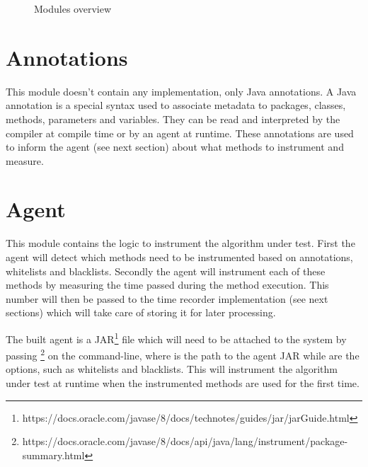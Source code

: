 \begin{figure}
  \caption{Modules overview}
  \label{fig:modules}
\end{figure}

\section{Annotations}
This module doesn't contain any implementation, only Java annotations. A Java annotation is a special syntax used to associate metadata to packages, classes, methods, parameters and variables. They can be read and interpreted by the compiler at compile time or by an agent at runtime. These annotations are used to inform the agent (see next section) about what methods to instrument and measure.


\section{Agent}
This module contains the logic to instrument the algorithm under test. First the agent will detect which methods need to be instrumented based on annotations, whitelists and blacklists. Secondly the agent will instrument each of these methods by measuring the time passed during the method execution. This number will then be passed to the time recorder implementation (see next sections) which will take care of storing it for later processing.

\noindent The built agent is a JAR\footnote{https://docs.oracle.com/javase/8/docs/technotes/guides/jar/jarGuide.html} file which will need to be attached to the system by passing \footnote{https://docs.oracle.com/javase/8/docs/api/java/lang/instrument/package-summary.html} on the command-line, where  is the path to the agent JAR while  are the options, such as whitelists and blacklists. This will instrument the algorithm under test at runtime when the instrumented methods are used for the first time.


